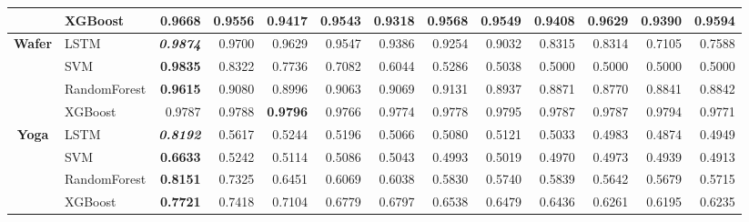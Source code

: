 \begin{table}[H]
\begin{adjustbox}{max width=14cm}
\begin{tabular}{|c|l|r|r|r|r|r|r|r|r|r|r|r|}
			                      & XGBoost      & \textbf{0.9668}          & 0.9556          & 0.9417          & 0.9543                   & 0.9318 & 0.9568          & 0.9549 & 0.9408          & 0.9629                   & 0.9390          & 0.9594                   \\
			\hline
			\textbf{Wafer}        & LSTM         & \textit{\textbf{0.9874}} & 0.9700          & 0.9629          & 0.9547                   & 0.9386 & 0.9254          & 0.9032 & 0.8315          & 0.8314                   & 0.7105          & 0.7588                   \\
			                      & SVM          & \textbf{0.9835}          & 0.8322          & 0.7736          & 0.7082                   & 0.6044 & 0.5286          & 0.5038 & 0.5000          & 0.5000                   & 0.5000          & 0.5000                   \\
			                      & RandomForest & \textbf{0.9615}          & 0.9080          & 0.8996          & 0.9063                   & 0.9069 & 0.9131          & 0.8937 & 0.8871          & 0.8770                   & 0.8841          & 0.8842                   \\
			                      & XGBoost      & 0.9787                   & 0.9788          & \textbf{0.9796} & 0.9766                   & 0.9774 & 0.9778          & 0.9795 & 0.9787          & 0.9787                   & 0.9794          & 0.9771                   \\
			\hline
			\textbf{Yoga}         & LSTM         & \textit{\textbf{0.8192}} & 0.5617          & 0.5244          & 0.5196                   & 0.5066 & 0.5080          & 0.5121 & 0.5033          & 0.4983                   & 0.4874          & 0.4949                   \\
			                      & SVM          & \textbf{0.6633}          & 0.5242          & 0.5114          & 0.5086                   & 0.5043 & 0.4993          & 0.5019 & 0.4970          & 0.4973                   & 0.4939          & 0.4913                   \\
			                      & RandomForest & \textbf{0.8151}          & 0.7325          & 0.6451          & 0.6069                   & 0.6038 & 0.5830          & 0.5740 & 0.5839          & 0.5642                   & 0.5679          & 0.5715                   \\
			                      & XGBoost      & \textbf{0.7721}          & 0.7418          & 0.7104          & 0.6779                   & 0.6797 & 0.6538          & 0.6479 & 0.6436          & 0.6261                   & 0.6195          & 0.6235                   \\

\end{tabular}
\end{adjustbox}
\end{table}
